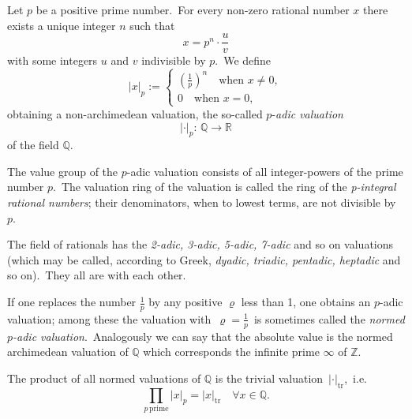 \documentclass[12pt]{article}
\begin{document}
Let $p$ be a positive prime number.\, For every non-zero rational number $x$ there exists a unique integer $n$ such that 
             $$x = p^n\cdot\frac{u}{v}$$
with some integers $u$ and $v$ indivisible by $p$.\, We define
$$|x|_p :=
 \begin{cases}
   (\frac{1}{p})^n \quad \mathrm{when} \,\, x \neq 0, \\
   0 \quad \mathrm{when} \,\, x=0,
 \end{cases}
$$
obtaining a  non-archimedean valuation, the so-called $p$-{\em adic valuation}
               $$|\cdot|_p:\,\mathbb{Q} \to \mathbb{R}$$
of the field $\mathbb{Q}$.

The value group of the $p$-adic valuation consists of all integer-powers of the prime number $p$.\, The valuation ring of the valuation is called the ring of the {\em p-integral rational numbers}; their denominators, when  to lowest terms, are not divisible by $p$.

The field of rationals has the {\em 2-adic, 3-adic, 5-adic, 7-adic} and so on valuations (which may be called, according to Greek, {\em dyadic, triadic, pentadic, heptadic} and so on).\, They all are  with each other.

If one replaces the  number $\frac{1}{p}$ by any positive  $\varrho$ less than 1, one obtains an  $p$-adic valuation; among these the valuation with\, $\varrho = \frac{1}{p}$\, is sometimes called the {\em normed $p$-adic valuation}.\, Analogously we can say that the absolute value is the normed archimedean valuation of $\mathbb{Q}$ which corresponds the infinite prime $\infty$ of $\mathbb{Z}$.

The product of all normed valuations of $\mathbb{Q}$ is the trivial valuation\, $|\cdot|_\mathrm{tr}$,\, i.e.
        $$\prod_{p\,\mathrm{prime}}|x|_p = |x|_\mathrm{tr} \quad 
                            \forall x\in\mathbb{Q}.$$
\end{document}
